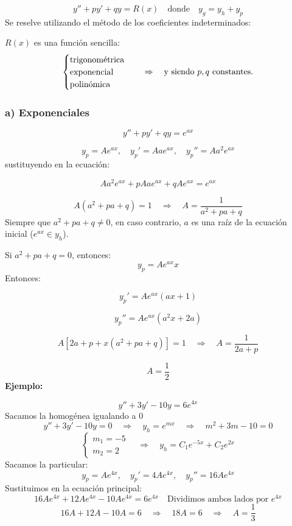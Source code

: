 \documentclass[a4paper,12pt]{article}
\begin{document}
\[
y'' + p y' + q y = R(x)
\quad \text{donde} \quad 
y_g = y_h + y_p
\]
Se reselve utilizando el método de los coeficientes indeterminados:  

\medskip
\noindent
\( R(x) \) es una función sencilla:
\[
\begin{cases}
\text{trigonométrica} \\
\text{exponencial} \\
\text{polinómica}
\end{cases}
\quad \Rightarrow \quad
\text{y siendo \( p, q \) constantes.}
\]


\subsubsection*{a) Exponenciales}
\vspace{-0,7 em}
\[
y'' + p y' + q y = e^{a x}
\]

\[
y_p = A e^{a x}, \quad y_p' = A a e^{a x}, \quad y_p'' = A a^2 e^{a x}
\]
sustituyendo en la ecuación:

\[
A a^2 e^{a x} + p A a e^{a x} + q A e^{a x} = e^{a x}
\]

\[
A (a^2 + p a + q) = 1
\quad \Rightarrow \quad 
A = \frac{1}{a^2 + p a + q}
\]
Siempre que \( a^2 + p a + q \neq 0 \),  
en caso contrario, \( a \) es una raíz de la ecuación inicial  
(\( e^{a x} \in y_h \)).

\medskip
\noindent
Si \( a^2 + p a + q = 0 \), entonces:
\[
y_p = A e^{a x} x
\]
Entonces:

\[
y_p' = A e^{a x} (a x + 1)
\]

\[
y_p'' = A e^{a x} (a^2 x + 2a)
\]

\[
A [2a + p + x(a^2 + p a + q)] = 1
\quad \Rightarrow \quad 
A = \frac{1}{2a + p}
\]

\[
A = \frac{1}{2}
\]
\noindent
\textbf{Ejemplo:}

\[
y'' + 3y' - 10y = 6e^{4x}
\]
Sacamos la homogénea igualando a 0
\vspace{0,2 em}
\[
y'' + 3y' - 10y = 0 
\quad \Rightarrow \quad 
y_h = e^{mx}
\quad \Rightarrow \quad 
m^2 + 3m - 10 = 0
\]
\vspace{-0,6 em}
\[
\begin{cases}
m_1 = -5 \\
m_2 = 2
\end{cases}
\quad \Rightarrow \quad 
y_h = C_1 e^{-5x} + C_2 e^{2x}
\]
Sacamos la particular:
\vspace{-0,1 em}
\[
y_p = A e^{4x}, 
\quad y_p' = 4A e^{4x}, 
\quad y_p'' = 16A e^{4x}
\]
Sustituimos en la ecuación principal:
\vspace{0,3 em}
\[
16A e^{4x} + 12A e^{4x} - 10A e^{4x} = 6 e^{4x}
\quad \text{Dividimos ambos lados por } e^{4x}
\]
\[
16A + 12A - 10A = 6 
\quad \Rightarrow \quad 
18A = 6 
\quad \Rightarrow \quad 
A = \frac{1}{3}
\]
\end{document}
